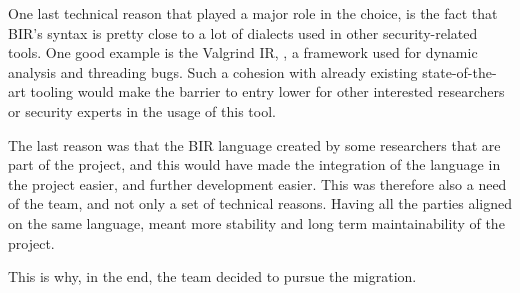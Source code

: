 One last technical reason that played a major role in the choice, is the fact
that BIR's syntax is pretty close to a lot of dialects used in other security-related
tools. One good example is the Valgrind IR, \cite{valgrind}, a framework used for
dynamic analysis and threading bugs. Such a cohesion with already existing state-of-the-art
tooling would make the barrier to entry lower for other interested researchers
or security experts in the usage of this tool.

The last reason was that the BIR language created by some researchers that are
part of the project, and this would have made the integration of the language in
the project easier, and further development easier. This was therefore also a need
of the team, and not only a set of technical reasons. Having all the parties aligned
on the same language, meant more stability and long term maintainability of the
project.

This is why, in the end, the team decided to pursue the migration.